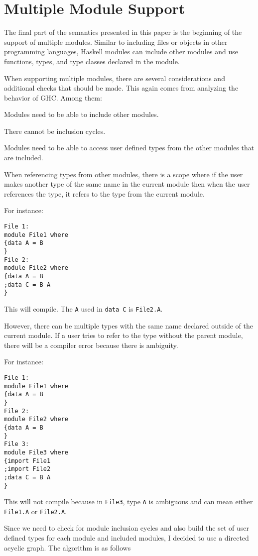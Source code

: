 \chapter{Multiple Module Support}
The final part of the semantics presented in this paper is the beginning of the support of multiple modules. Similar to including files or objects in other programming languages, Haskell modules can include other modules and use functions, types, and type classes declared in the module.

When supporting multiple modules, there are several considerations and additional checks that should be made. This again comes from analyzing the behavior of GHC.
Among them:

Modules need to be able to include other modules.

There cannot be inclusion cycles.

Modules need to be able to access user defined types from the other modules that are included.

When referencing types from other modules, there is a scope where if the user makes another type of the same name in the current module then when the user references the type, it refers to the type from the current module.

For instance:
\begin{lstlisting}
File 1:
module File1 where
{data A = B
}
File 2:
module File2 where
{data A = B
;data C = B A
}
\end{lstlisting}

This will compile. The \texttt{A} used in \texttt{data C} is \texttt{File2.A}.

However, there can be multiple types with the same name declared outside of the current module. If a user tries to refer to the type without the parent module, there will be a compiler error because there is ambiguity.

For instance:

\begin{lstlisting}
File 1:
module File1 where
{data A = B
}
File 2:
module File2 where
{data A = B
}
File 3:
module File3 where
{import File1
;import File2
;data C = B A
}
\end{lstlisting}

This will not compile because in \texttt{File3}, type \texttt{A} is ambiguous and can mean either \texttt{File1.A} or \texttt{File2.A}.

Since we need to check for module inclusion cycles and also build the set of user defined types for each module and included modules, I decided to use a directed acyclic graph.
The algorithm is as follows


